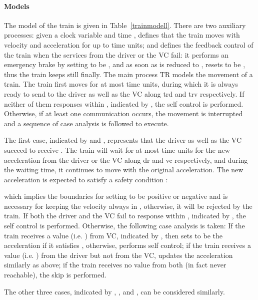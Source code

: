 \documentclass{llncs}
\begin{document}
\paragraph{\textbf{Models}}
The model of the train is given in Table~\ref{trainmodell}. There are two auxiliary processes:
given a clock variable  and  time  ,
 defines that the train moves with velocity  and acceleration 
for up to  time units;
and  defines the feedback control of the train when the services from
the driver or the VC fail: it performs
an emergency brake by setting
   to be  ,  and
as soon as  is reduced to , resets  to be , thus the train keeps still finally.
The main process \textsf{TR}
models the movement of a train. The train first moves for at most  time units,
during which it is always ready to
send  to the driver as well as the VC along \textsf{trd} and \textsf{trv} respectively.
If neither of them responses within , indicated by ,
the self control is performed.
Otherwise, if at least one communication occurs,
the movement is interrupted and a sequence of
case analysis is followed to execute.


The first case, indicated by  and ,
represents that the driver as well as the VC succeed to receive .
The train will wait for at most  time units
for
the new acceleration from the  driver or the VC along \textsf{dr} and \textsf{vc} respectively, and during the waiting time, it
continues to move with the original acceleration. The new acceleration is expected to satisfy a
 safety condition :
 \vspace{-0.5em}
 
which implies the boundaries for setting  to be positive or negative and is necessary for keeping the velocity always in
, otherwise, it will be rejected by the train.
If both the driver and the VC fail to response within , indicated by ,
 the self control is performed.
 Otherwise, the following case analysis is taken:
 If the train receives a value (i.e. ) from  VC,
 indicated by , then sets 
 to be the acceleration if it satisfies ,
otherwise, performs self control; if the train receives a value (i.e. ) from the driver but not from
the VC, updates the acceleration similarly as above; if
the train receives no value from both (in fact never reachable), the skip is performed.





The  other three cases, indicated by , , and ,
can be considered similarly.
\end{document}
